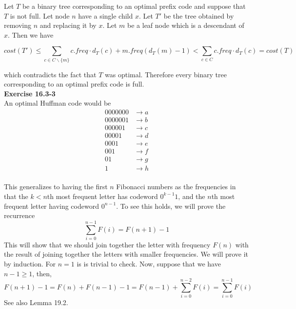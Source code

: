 \documentclass{article}
\begin{document}
Let $T$ be a binary tree corresponding to an optimal prefix code and suppose that $T$ is not full.  Let node $n$ have a single child $x$.  Let $T'$ be the tree obtained by removing $n$ and replacing it by $x$.  Let $m$ be a leaf node which is a descendant of $x$.  Then we have

\[ cost(T') \leq \sum_{c \in C \backslash \{m\} } c.freq \cdot d_{T}(c) + m.freq(d_T(m) - 1) < \sum_{c \in C} c.freq \cdot d_{T}(c) = cost(T)\]

which contradicts the fact that $T$ was optimal.  Therefore every binary tree corresponding to an optimal prefix code is full.\\


\noindent\textbf{Exercise 16.3-3}\\

An optimal Huffman code would be 
\begin{align*}
0000000 &\rightarrow a\\
0000001 &\rightarrow b\\
000001 &\rightarrow c\\
00001 &\rightarrow d\\
0001 &\rightarrow e\\
001 &\rightarrow f\\
01 &\rightarrow g\\
1 &\rightarrow h\\
\end{align*}

This generalizes to having the first $n$ Fibonacci numbers as the frequencies in that the $k<n$th most frequent letter has codeword $0^{k-1}1$, and the $n$th most frequent letter having codeword $0^{n-1}$. To see this holds, we will prove the recurrence 
\[
\sum_{i=0}^{n-1} F(i) = F(n+1)-1
\]
This will show that we should join together the letter with frequency $F(n)$ with the result of joining together the letters with smaller frequencies. We will prove it by induction. For $n=1$ is is trivial to check. Now, suppose that we have $n-1\ge1$, then, 
\[
F(n+1) - 1 = F(n) + F(n-1) -1 = F(n-1) + \sum_{i=0}^{n-2} F(i) = \sum_{i=0}^{n-1} F(i)
\]
See also Lemma 19.2.
\end{document}

